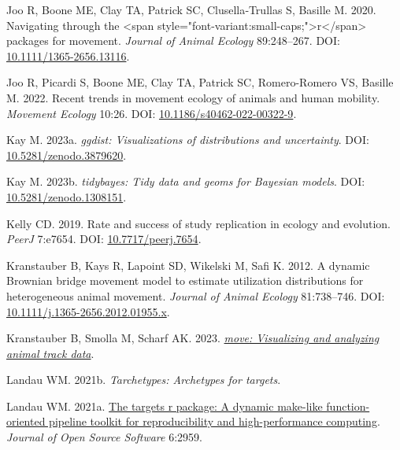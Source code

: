 \documentclass[10pt,a4paper]{article}
\newlength{\cslhangindent}
\newenvironment{CSLReferences}[2] %
 {\begin{list}{}{%
  \setlength{\itemindent}{0pt}
  \setlength{\leftmargin}{0pt}
  \setlength{\parsep}{0pt}
  \ifodd #1
   \setlength{\leftmargin}{\cslhangindent}
   \setlength{\itemindent}{-1\cslhangindent}
  \fi
  \setlength{\itemsep}{#2\baselineskip}}}
 {\end{list}}
\begin{document}
\begin{CSLReferences}{1}{0}
Joo R, Boone ME, Clay TA, Patrick SC, Clusella‐Trullas S, Basille M. 2020. Navigating through the {\textless{}}span style="font-variant:small-caps;"{\textgreater{}}r{\textless{}}/span{\textgreater{}} packages for movement. \emph{Journal of Animal Ecology} 89:248--267. DOI: \href{https://doi.org/10.1111/1365-2656.13116}{10.1111/1365-2656.13116}.

Joo R, Picardi S, Boone ME, Clay TA, Patrick SC, Romero-Romero VS, Basille M. 2022. Recent trends in movement ecology of animals and human mobility. \emph{Movement Ecology} 10:26. DOI: \href{https://doi.org/10.1186/s40462-022-00322-9}{10.1186/s40462-022-00322-9}.

Kay M. 2023a. \emph{{ggdist}: Visualizations of distributions and uncertainty}. DOI: \href{https://doi.org/10.5281/zenodo.3879620}{10.5281/zenodo.3879620}.

Kay M. 2023b. \emph{{tidybayes}: Tidy data and geoms for {Bayesian} models}. DOI: \href{https://doi.org/10.5281/zenodo.1308151}{10.5281/zenodo.1308151}.

Kelly CD. 2019. Rate and success of study replication in ecology and evolution. \emph{PeerJ} 7:e7654. DOI: \href{https://doi.org/10.7717/peerj.7654}{10.7717/peerj.7654}.

Kranstauber B, Kays R, Lapoint SD, Wikelski M, Safi K. 2012. A dynamic {Brownian} bridge movement model to estimate utilization distributions for heterogeneous animal movement. \emph{Journal of Animal Ecology} 81:738--746. DOI: \href{https://doi.org/10.1111/j.1365-2656.2012.01955.x}{10.1111/j.1365-2656.2012.01955.x}.

Kranstauber B, Smolla M, Scharf AK. 2023. \emph{\href{https://CRAN.R-project.org/package=move}{{move}: Visualizing and analyzing animal track data}}.

Landau WM. 2021b. \emph{Tarchetypes: Archetypes for targets}.

Landau WM. 2021a. \href{https://doi.org/10.21105/joss.02959}{The targets r package: A dynamic make-like function-oriented pipeline toolkit for reproducibility and high-performance computing}. \emph{Journal of Open Source Software} 6:2959.


\end{CSLReferences}
\end{document}
